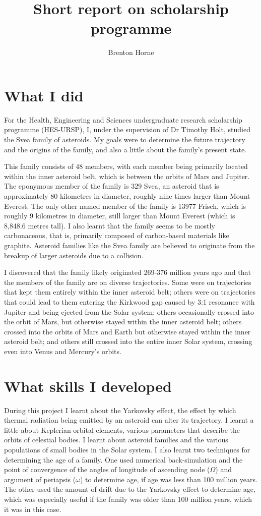 \documentclass[12pt,a4paper,openright]{article}
\title{Short report on scholarship programme}
\author{Brenton Horne}
\begin{document}
\maketitle

\section{What I did}
For the Health, Engineering and Sciences undergraduate research scholarship programme (HES-URSP), I, under the supervision of Dr Timothy Holt, studied the Svea family of asteroids. My goals were to determine the future trajectory and the origins of the family, and also a little about the family's present state. 

This family consists of 48 members, with each member being primarily located within the inner asteroid belt, which is between the orbits of Mars and Jupiter. The eponymous member of the family is 329 Svea, an asteroid that is approximately 80 kilometres in diameter, roughly nine times larger than Mount Everest. The only other named member of the family is 13977 Frisch, which is roughly 9 kilometres in diameter, still larger than Mount Everest (which is 8,848.6 metres tall). I also learnt that the family seems to be mostly carbonaceous, that is, primarily composed of carbon-based materials like graphite. Asteroid families like the Svea family are believed to originate from the breakup of larger asteroids due to a collision. 

I discovered that the family likely originated 269-376 million years ago and that the members of the family are on diverse trajectories. Some were on trajectories that kept them entirely within the inner asteroid belt; others were on trajectories that could lead to them entering the Kirkwood gap caused by 3:1 resonance with Jupiter and being ejected from the Solar system; others occasionally crossed into the orbit of Mars, but otherwise stayed within the inner asteroid belt; others crossed into the orbits of Mars and Earth but otherwise stayed within the inner asteroid belt; and others still crossed into the entire inner Solar system, crossing even into Venus and Mercury's orbits. 

\section{What skills I developed}
During this project I learnt about the Yarkovsky effect, the effect by which thermal radiation being emitted by an asteroid can alter its trajectory. I learnt a little about Keplerian orbital elements, various parameters that describe the orbits of celestial bodies. I learnt about asteroid families and the various populations of small bodies in the Solar system. I also learnt two techniques for determining the age of a family. One used numerical back-simulation and the point of convergence of the angles of longitude of ascending node ($\Omega$) and argument of periapsis ($\omega$) to determine age, if age was less than 100 million years. The other used the amount of drift due to the Yarkovsky effect to determine age, which was especially useful if the family was older than 100 million years, which it was in this case. 
\end{document}
